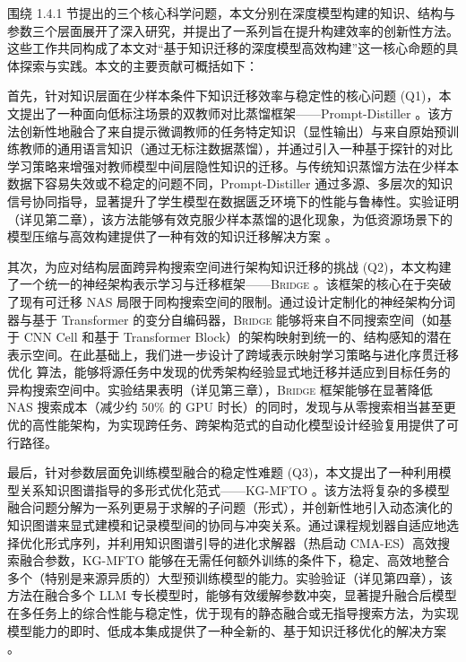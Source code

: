 \documentclass[../main.tex]{subfiles}
\begin{document}
\label{sec:ch1-4-2-main-contributions-overview}

围绕 1.4.1 节提出的三个核心科学问题，本文分别在深度模型构建的知识、结构与参数三个层面展开了深入研究，并提出了一系列旨在提升构建效率的创新性方法。这些工作共同构成了本文对“基于知识迁移的深度模型高效构建”这一核心命题的具体探索与实践。本文的主要贡献可概括如下：

首先，针对知识层面在少样本条件下知识迁移效率与稳定性的核心问题 (Q1)，本文提出了一种面向低标注场景的双教师对比蒸馏框架——Prompt-Distiller 。该方法创新性地融合了来自提示微调教师的任务特定知识（显性输出）与来自原始预训练教师的通用语言知识（通过无标注数据蒸馏），并通过引入一种基于探针的对比学习策略来增强对教师模型中间层隐性知识的迁移。与传统知识蒸馏方法在少样本数据下容易失效或不稳定的问题不同，Prompt-Distiller 通过多源、多层次的知识信号协同指导，显著提升了学生模型在数据匮乏环境下的性能与鲁棒性。实验证明（详见第二章），该方法能够有效克服少样本蒸馏的退化现象，为低资源场景下的模型压缩与高效构建提供了一种有效的知识迁移解决方案 。

其次，为应对结构层面跨异构搜索空间进行架构知识迁移的挑战 (Q2)，本文构建了一个统一的神经架构表示学习与迁移框架——\textsc{Bridge} 。该框架的核心在于突破了现有可迁移 NAS 局限于同构搜索空间的限制。通过设计定制化的神经架构分词器与基于 Transformer 的变分自编码器，\textsc{Bridge} 能够将来自不同搜索空间（如基于 CNN Cell 和基于 Transformer Block）的架构映射到统一的、结构感知的潜在表示空间。在此基础上，我们进一步设计了跨域表示映射学习策略与进化序贯迁移优化 算法，能够将源任务中发现的优秀架构经验显式地迁移并适应到目标任务的异构搜索空间中。实验结果表明（详见第三章），\textsc{Bridge} 框架能够在显著降低 NAS 搜索成本（减少约 50\% 的 GPU 时长）的同时，发现与从零搜索相当甚至更优的高性能架构，为实现跨任务、跨架构范式的自动化模型设计经验复用提供了可行路径。

最后，针对参数层面免训练模型融合的稳定性难题 (Q3)，本文提出了一种利用模型关系知识图谱指导的多形式优化范式——KG-MFTO 。该方法将复杂的多模型融合问题分解为一系列更易于求解的子问题（形式），并创新性地引入动态演化的知识图谱来显式建模和记录模型间的协同与冲突关系。通过课程规划器自适应地选择优化形式序列，并利用知识图谱引导的进化求解器（热启动 CMA-ES）高效搜索融合参数，KG-MFTO 能够在无需任何额外训练的条件下，稳定、高效地整合多个（特别是来源异质的）大型预训练模型的能力。实验验证（详见第四章），该方法在融合多个 LLM 专长模型时，能够有效缓解参数冲突，显著提升融合后模型在多任务上的综合性能与稳定性，优于现有的静态融合或无指导搜索方法，为实现模型能力的即时、低成本集成提供了一种全新的、基于知识迁移优化的解决方案 。
\end{document}
